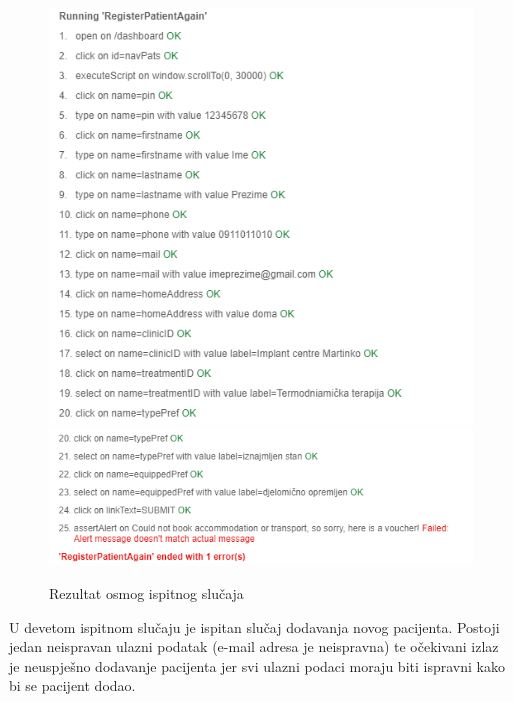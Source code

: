 			\begin{figure}[H]
				\centering
				\includegraphics[width=\textwidth]{"slike/Selenium/pacijent testovi/registerPatientAgain_results0.png"}
				\includegraphics[width=\textwidth]{"slike/Selenium/pacijent testovi/registerPatientAgain_results1.png"}
				\caption{Rezultat osmog ispitnog slučaja}
				\label{fig: registerPatientAgain_results}
			\end{figure}
			\eject
			U devetom ispitnom slučaju je ispitan slučaj dodavanja novog pacijenta. Postoji jedan neispravan ulazni podatak (e-mail adresa je neispravna) te očekivani izlaz je neuspješno dodavanje pacijenta jer svi ulazni podaci moraju biti ispravni kako bi se pacijent dodao.
